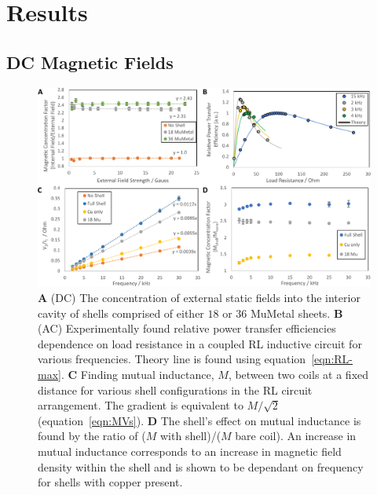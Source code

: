 \documentclass[11pt]{iopart}
\begin{document}
\section{Results}
\subsection{DC Magnetic Fields}

\begin{figure}
  \begin{center}
   \noindent\includegraphics[width=\linewidth]{images/compoundRL.pdf}
  \end{center}
  \caption{
    \textbf{A} (DC) The concentration of external static fields into
    the interior cavity of shells comprised of either $18$ or $36$
    MuMetal sheets.
    \textbf{B} (AC) Experimentally found relative power transfer
    efficiencies dependence on load resistance in a coupled RL
    inductive circuit for various frequencies. Theory line is found
    using equation~\ref{eqn:RL-max}.
    \textbf{C} Finding mutual inductance, $M$, between two coils at a
    fixed distance for various shell configurations in the RL circuit
    arrangement.  The gradient is equivalent to $M/\sqrt{2}$
    (equation~\ref{eqn:MVs}).
    \textbf{D} The shell's effect on mutual inductance is found by the
    ratio of ($M$ with shell)/($M$ bare coil). An increase in mutual
    inductance corresponds to an increase in magnetic field density
    within the shell and is shown to be dependant on frequency for
    shells with copper present.}
  \label{fig:DC_RL}
\end{figure}
\end{document}
